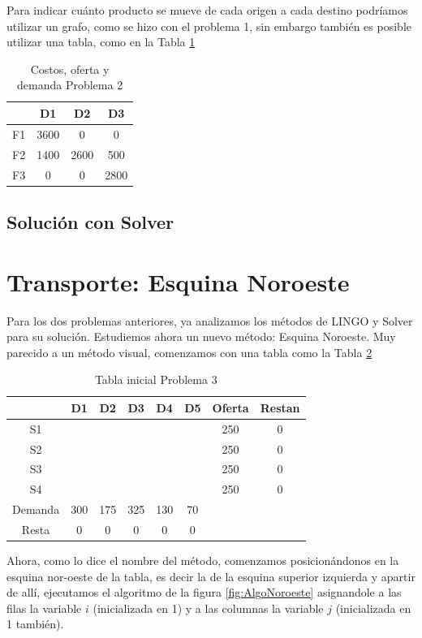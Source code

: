\documentclass[12pt]{article}  %
\begin{document}
Para indicar cuánto producto se mueve de cada origen a cada destino podríamos utilizar un grafo, como se hizo con el problema 1, sin embargo también es posible utilizar una tabla, como en la Tabla \ref{tab:resProb2}

\begin{table}[H]
\centering
\caption{Costos, oferta y demanda Problema 2}
\label{tab:resProb2}
\begin{tabular}{c|ccc}
& D1 & D2 & D3 \\
\hline
F1 & 3600 & 0 & 0 \\
F2 & 1400 & 2600 & 500 \\
F3 & 0 & 0 & 2800 \\
\end{tabular}
\end{table}

\subsection{Solución con Solver}

\section{Transporte: Esquina Noroeste}
Para los dos problemas anteriores, ya analizamos los métodos de LINGO y Solver para su solución. Estudiemos ahora un nuevo método: Esquina Noroeste. Muy parecido a un método visual, comenzamos con una tabla como la Tabla \ref{tab:Prob3}

\begin{table}[H]
\centering
\caption{Tabla inicial Problema 3}
\label{tab:Prob3}
\begin{tabular}{c|ccccc|cc}
& D1 & D2 & D3 & D4 & D5 & Oferta & Restan \\
\hline
S1 &  &  &  &  &  & 250 & 0 \\
S2 &  &  &  &  &  & 250 & 0 \\
S3 &  &  &  &  &  & 250 & 0 \\
S4 &  &  &  &  &  & 250 & 0 \\
\hline
Demanda & 300 & 175 & 325 & 130 & 70 & & \\
Resta & 0 & 0 & 0 & 0 & 0 & & \\
\end{tabular}
\end{table}

Ahora, como lo dice el nombre del método, comenzamos posicionándonos en la esquina nor-oeste de la tabla, es decir la de la esquina superior izquierda y apartir de allí, ejecutamos el algoritmo de la figura \ref{fig:AlgoNoroeste} asignandole a las filas la variable $i$ (inicializada en 1) y a las columnas la variable $j$ (inicializada en 1 también).
\end{document}
